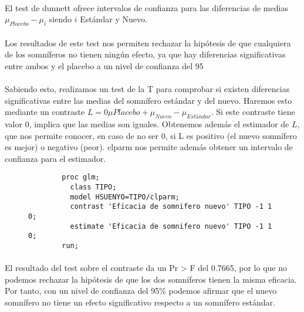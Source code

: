 \documentclass{article}
\begin{document}
    \paragraph{}
    El test de dunnett ofrece intervalos de confianza para las diferencias de medias $\mu_{Placebo} - \mu_{i}$ siendo $i$ Estándar y Nuevo.

    \paragraph{}
    Los resultados de este test nos permiten rechazar la hipótesis de que cualquiera de los somníferos no tienen ningún efecto, ya que hay diferencias significativas entre ambos y el placebo a un nivel de confianza del 95%

    \paragraph{}
    Sabiendo esto, realizamos un test de la T para comprobar si existen diferencias significativas entre las medias del somnífero estándar y del nuevo. Haremos esto mediante un contraste $L=0\mu{Placebo} + \mu_{Nuevo} - \mu_{Estándar}$. Si este contraste tiene valor 0, implica que las medias son iguales. Obtenemos además el estimador de $L$, que nos permite conocer, en caso de no ser 0, si L es positivo (el nuevo somnífero es mejor) o negativo (peor). clparm nos permite además obtener un intervalo de confianza para el estimador.

    \begin{figure}[h]
      \centering
      \begin{verbatim}
        proc glm;
          class TIPO;
          model HSUENYO=TIPO/clparm;
          contrast 'Eficacia de somnifero nuevo' TIPO -1 1 0;
          estimate 'Eficacia de somnifero nuevo' TIPO -1 1 0;
        run;
      \end{verbatim}
      \label{code:sas_2}
    \end{figure}

    \paragraph{}
    El resultado del test sobre el contraste da un Pr > F del 0.7665, por lo que no podemos rechazar la hipótesis de que los dos somníferos tienen la misma eficacia. Por tanto, con un nivel de confianza del 95\% podemos afirmar que el nuevo somnífero no tiene un efecto significativo respecto a un somnífero estándar.
\end{document}
